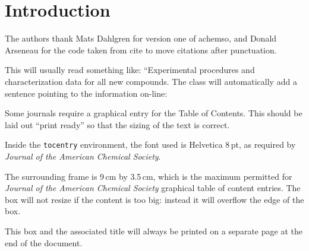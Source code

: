 \documentclass[journal=apchd5,manuscript=article,layout=twocolumn]{achemso}
\begin{document}
\begin{abstract}
  \lipsum[1-1]
\end{abstract}


\section{Introduction}

\lipsum[2-4]







\begin{acknowledgement}

The authors thank Mats Dahlgren for version one of \textsf{achemso},
and Donald Arseneau for the code taken from \textsf{cite} to move
citations after punctuation.

\end{acknowledgement}


\begin{suppinfo}
This will usually read something like: ``Experimental procedures and
characterization data for all new compounds. The class will
automatically add a sentence pointing to the information on-line:
\end{suppinfo}




\begin{tocentry}
Some journals require a graphical entry for the Table of Contents.
This should be laid out ``print ready'' so that the sizing of the
text is correct.

Inside the \texttt{tocentry} environment, the font used is Helvetica
8\,pt, as required by \emph{Journal of the American Chemical
Society}.

The surrounding frame is 9\,cm by 3.5\,cm, which is the maximum
permitted for  \emph{Journal of the American Chemical Society}
graphical table of content entries. The box will not resize if the
content is too big: instead it will overflow the edge of the box.

This box and the associated title will always be printed on a
separate page at the end of the document.
\end{tocentry}
\end{document}
